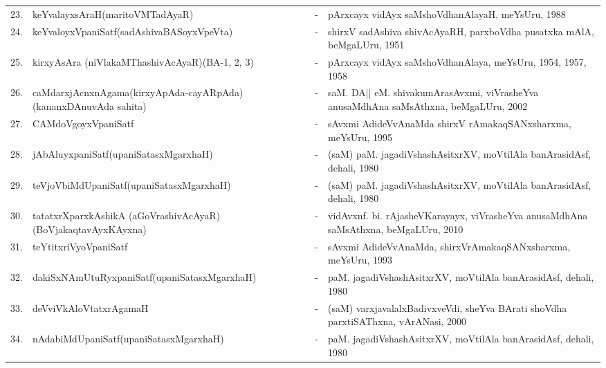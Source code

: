 {\begin{longtable}{rp{6cm}cp{9cm}<{\raggedright}}
23. & keYvalayxsAraH\newline (maritoVMTadAyaR) &-& pArxcayx vidAyx saMshoVdhanAlayaH, meYsUru, 1988\\
24. & keYvaloyxVpaniSatf\newline (sadAshivaBASoyxVpeVta) &-& shirxV sadAshiva shivAcAyaRH, parxboVdha pusatxka mAlA, beMgaLUru, 1951\\
25. & kirxyAsAra (niVlakaMThashivAcAyaR)\newline (BA-1, 2, 3) &-& pArxcayx vidAyx saMshoVdhanAlaya, meYsUru, 1954, 1957, 1958\\
26. & caMdarxjAcnxnAgama\newline (kirxyApAda-cayARpAda)\newline (kananxDAnuvAda sahita) &-& saM. DA|| eM. shivakumArasAvxmi, viVrasheYva anusaMdhAna saMsAthxna, beMgaLUru, 2002\\
27. & CAMdoVgoyxVpaniSatf &-& sAvxmi AdideVvAnaMda shirxV rAmakaqSANxsharxma, meYsUru, 1995\\
28. & jAbAluyxpaniSatf\newline (upaniSatasxMgarxhaH) &-& (saM) paM. jagadiVshashAsitxrXV, moVtilAla banArasidAsf, dehali, 1980\\
29. & teVjoVbiMdUpaniSatf\newline (upaniSatasxMgarxhaH) &-& (saM) paM. jagadiVshashAsitxrXV, moVtilAla banArasidAsf, dehali, 1980\\
30. & tatatxrXparxkAshikA (aGoVrashivAcAyaR)\newline (BoVjakaqtavAyxKAyxna) &-& vidAvxnf. bi. rAjasheVKarayayx, viVrasheYva anusaMdhAna saMsAthxna, beMgaLUru, 2010\\
31. & teYtitxriVyoVpaniSatf &-& sAvxmi AdideVvAnaMda, shirxVrAmakaqSANxsharxma, meYsUru, 1993\\
32. & dakiSxNAmUtuRyxpaniSatf\newline (upaniSatasxMgarxhaH) &-& paM. jagadiVshashAsitxrXV, moVtilAla banArasidAsf, dehali, 1980\\
33. & deVviVkAloVtatxrAgamaH &-& (saM) varxjavalalxBadivxveVdi, sheYva BArati shoVdha parxtiSAThxna, vArANasi, 2000\\
34. & nAdabiMdUpaniSatf\newline (upaniSatasxMgarxhaH) &-& paM. jagadiVshashAsitxrXV, moVtilAla banArasidAsf, dehali, 1980\\

\end{longtable}}
